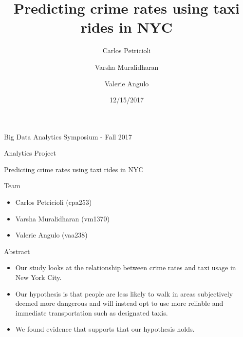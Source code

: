 \documentclass[10pt,ignorenonframetext,]{beamer}
\author{Carlos Petricioli \and
    Varsha Muralidharan   \and
    Valerie Angulo  }
\institute[New York University]{ New York University \\ \{cpa253,vm1370,vaa238\}@nyu.edu }
\title{Predicting crime rates using taxi rides in NYC}
\date{12/15/2017}
\providecommand{\tightlist}{%
  \setlength{\itemsep}{0pt}\setlength{\parskip}{0pt}}
\begin{document}
\frame{\titlepage}

\begin{frame}{%
\protect\hypertarget{big-data-analytics-symposium---fall-2017}{%
Big Data Analytics Symposium - Fall 2017}}

\begin{block}{Analytics Project}

Predicting crime rates using taxi rides in NYC

\end{block}

\begin{block}{Team}

\begin{itemize}
\item
  Carlos Petricioli (cpa253)
\item
  Varsha Muralidharan (vm1370)
\item
  Valerie Angulo (vaa238)
\end{itemize}

\end{block}

\begin{block}{Abstract}

\begin{itemize}
\tightlist
\item
  Our study looks at the relationship between crime rates and taxi usage
  in New York City.
\item
  Our hypothesis is that people are less likely to walk in areas
  subjectively deemed more dangerous and will instead opt to use more
  reliable and immediate transportation such as designated taxis.
\item
  We found evidence that supports that our hypothesis holds.
\end{itemize}

\end{block}

\end{frame}
\end{document}
